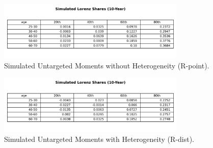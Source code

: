 \begin{figure}[htbp]
\centering
\includegraphics[width=0.8\textwidth]{Tables/Sim_Lorenz_10yr_LCrrPointNetWorth.png}
\caption{Simulated Untargeted Moments without Heterogeneity (R-point).}
\label{fig:SimLorenzTarPoint}
\end{figure}

\begin{figure}[htbp]
\centering
\includegraphics[width=0.8\textwidth]{Tables/Sim_Lorenz_10yr_LCrrDistNetWorth.png}
\caption{Simulated Untargeted Moments with Heterogeneity (R-dist).}
\label{fig:SimLorenzTarDist}
\end{figure}
